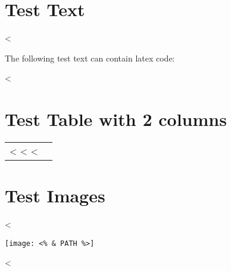\documentclass[a4paper,landscape]{article}
\begin{document}
\section{Test Text}

<%

The following test text can contain latex code:

<%

\section{Test Table with 2 columns}

\begin{tabular}{|l|l|}
\hline
<%
<%
\hline
<%
\end{tabular}

\section{Test Images}

<%
\begin{center}
\texttt{[image: <\% \& PATH \%>]}
\end{center}
<%
\end{document}
